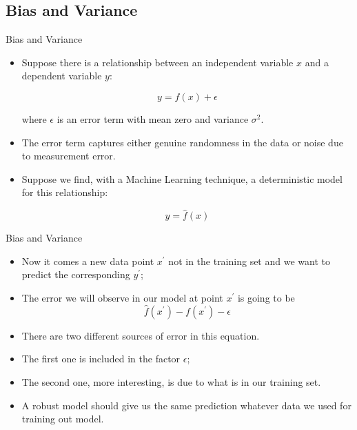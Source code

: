 \documentclass[11pt]{beamer}
\begin{document}
\subsection[subsection]{Bias and Variance}
%
\begin{frame}{Bias and Variance}
\begin{itemize}
\item Suppose there is a relationship between an independent variable $x$ and a dependent variable $y$:

\begin{equation}
    y=f(x) + \epsilon
\end{equation}

where $\epsilon$ is an error term with mean zero and variance $\sigma^2$. 

\item The error term captures either genuine randomness in the data or noise due to measurement error.

\item Suppose we find, with a Machine Learning technique,  a deterministic model for this relationship:

\begin{equation}
    y = \hat f(x)
\end{equation}
 
\end{itemize}
\end{frame}
%
%
\begin{frame}{Bias and Variance}
\begin{itemize}
\item Now it comes a new data point $x^\prime$ not in the training set and we want to predict the corresponding $y^\prime$;
\item The error we will observe in our model at point $x^\prime$ is going to be
\begin{equation}
    \hat f(x^\prime) - f(x^\prime) - \epsilon
\end{equation}
\item There are two different sources of error in this equation. 
\item The first one is included in the factor $\epsilon$; 
\item The second one, more interesting, is due to what is in our training set. 
\item A robust model should give us the same prediction whatever data we used for training out model.
\end{itemize}
\end{frame}
\end{document}
